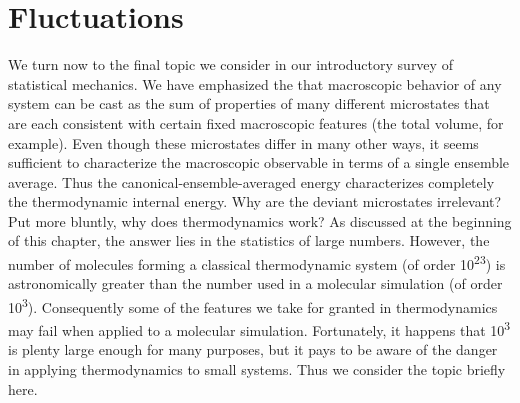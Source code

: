 \documentclass[9pt,bestpractices]{molsim}
\begin{document}
\section{Fluctuations}\label{fluctuations}

We turn now to the final topic we consider in our introductory survey of
statistical mechanics. We have emphasized the that macroscopic behavior
of any system can be cast as the sum of properties of many different
microstates that are each consistent with certain fixed macroscopic
features (the total volume, for example). Even though these microstates
differ in many other ways, it seems sufficient to characterize the
macroscopic observable in terms of a single ensemble average. Thus the
canonical-ensemble-averaged energy characterizes completely the
thermodynamic internal energy. Why are the deviant microstates
irrelevant? Put more bluntly, why does thermodynamics work? As discussed
at the beginning of this chapter, the answer lies in the statistics of
large numbers. However, the number of molecules forming a classical
thermodynamic system (of order 10\textsuperscript{23}) is astronomically
greater than the number used in a molecular simulation (of order
10\textsuperscript{3}). Consequently some of the features we take for
granted in thermodynamics may fail when applied to a molecular
simulation. Fortunately, it happens that 10\textsuperscript{3} is plenty
large enough for many purposes, but it pays to be aware of the danger in
applying thermodynamics to small systems. Thus we consider the topic
briefly here.
\end{document}
